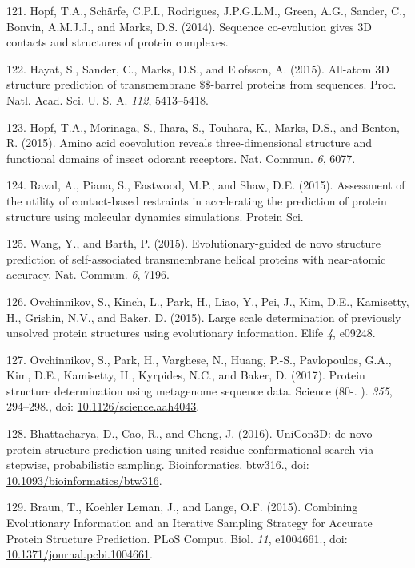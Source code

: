 \documentclass[11pt,a4paper,twoside]{book}
\theoremstyle{definition}
\theoremstyle{definition}
\theoremstyle{remark}
\begin{document}
\hypertarget{ref-Hopf2014}{}
121. Hopf, T.A., Schärfe, C.P.I., Rodrigues, J.P.G.L.M., Green, A.G.,
Sander, C., Bonvin, A.M.J.J., and Marks, D.S. (2014). Sequence
co-evolution gives 3D contacts and structures of protein complexes.

\hypertarget{ref-Hayat2015a}{}
122. Hayat, S., Sander, C., Marks, D.S., and Elofsson, A. (2015).
All-atom 3D structure prediction of transmembrane \$\$-barrel proteins
from sequences. Proc. Natl. Acad. Sci. U. S. A. \emph{112}, 5413--5418.

\hypertarget{ref-Hopf2015a}{}
123. Hopf, T.A., Morinaga, S., Ihara, S., Touhara, K., Marks, D.S., and
Benton, R. (2015). Amino acid coevolution reveals three-dimensional
structure and functional domains of insect odorant receptors. Nat.
Commun. \emph{6}, 6077.

\hypertarget{ref-Raval2015a}{}
124. Raval, A., Piana, S., Eastwood, M.P., and Shaw, D.E. (2015).
Assessment of the utility of contact-based restraints in accelerating
the prediction of protein structure using molecular dynamics
simulations. Protein Sci.

\hypertarget{ref-Wang2015}{}
125. Wang, Y., and Barth, P. (2015). Evolutionary-guided de novo
structure prediction of self-associated transmembrane helical proteins
with near-atomic accuracy. Nat. Commun. \emph{6}, 7196.

\hypertarget{ref-Ovchinnikov2015a}{}
126. Ovchinnikov, S., Kinch, L., Park, H., Liao, Y., Pei, J., Kim, D.E.,
Kamisetty, H., Grishin, N.V., and Baker, D. (2015). Large scale
determination of previously unsolved protein structures using
evolutionary information. Elife \emph{4}, e09248.

\hypertarget{ref-Ovchinnikov2017}{}
127. Ovchinnikov, S., Park, H., Varghese, N., Huang, P.-S., Pavlopoulos,
G.A., Kim, D.E., Kamisetty, H., Kyrpides, N.C., and Baker, D. (2017).
Protein structure determination using metagenome sequence data. Science
(80-. ). \emph{355}, 294--298., doi:
\href{https://doi.org/10.1126/science.aah4043}{10.1126/science.aah4043}.

\hypertarget{ref-Bhattacharya2016}{}
128. Bhattacharya, D., Cao, R., and Cheng, J. (2016). UniCon3D: de novo
protein structure prediction using united-residue conformational search
via stepwise, probabilistic sampling. Bioinformatics, btw316., doi:
\href{https://doi.org/10.1093/bioinformatics/btw316}{10.1093/bioinformatics/btw316}.

\hypertarget{ref-Braun2015}{}
129. Braun, T., Koehler Leman, J., and Lange, O.F. (2015). Combining
Evolutionary Information and an Iterative Sampling Strategy for Accurate
Protein Structure Prediction. PLoS Comput. Biol. \emph{11}, e1004661.,
doi:
\href{https://doi.org/10.1371/journal.pcbi.1004661}{10.1371/journal.pcbi.1004661}.
\end{document}

